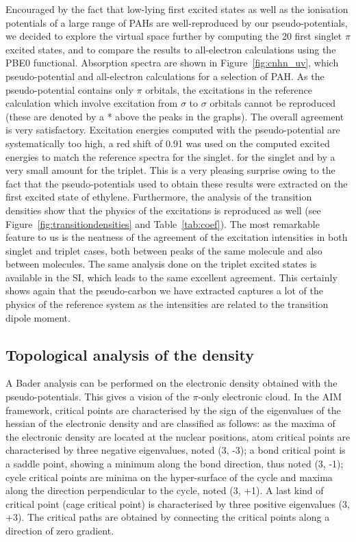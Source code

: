\documentclass[12pt]{article}
\begin{document}
Encouraged by the fact that low-lying first excited states as well as the ionisation potentials of a large range of PAHs are 
well-reproduced by our pseudo-potentials,
we decided to explore the virtual space further by computing the 20 first singlet
$\pi$ excited states, and to compare the results to all-electron calculations using the PBE0 functional.
Absorption spectra are shown in Figure~\ref{fig:cnhn_uv}, which pseudo-potential and all-electron
calculations for a selection of PAH.
As the pseudo-potential contains only $\pi$ orbitals, the excitations in the reference
calculation which involve excitation from $\sigma$ to $\sigma$ orbitals cannot be reproduced 
(these are denoted by a * above the peaks in the graphs).
The overall agreement is very satisfactory.
Excitation energies computed with the pseudo-potential are systematically too high, a red shift of
0.91 was used on the computed excited energies to match the reference spectra for the singlet.
for the singlet and by a very small amount for the triplet.
This is a very pleasing surprise owing to the fact that the pseudo-potentials used
to obtain these results were extracted on the first excited state of ethylene.
Furthermore, the analysis of the transition densities show that the physics of the excitations
is reproduced as well (see Figure~\ref{fig:transitiondensities} and Table~\ref{tab:coef}).
The most remarkable feature to us is the neatness of the agreement of the excitation intensities in both singlet and triplet cases, both between peaks of the same molecule and also between molecules.
The same analysis done on the triplet excited states is available in the SI, which leads to the same
excellent agreement.
This certainly shows again that the pseudo-carbon we have extracted captures a lot of the physics of the reference system as the intensities are related to the transition dipole moment.

\subsection*{\sffamily \large Topological analysis of the density}
A Bader analysis can be performed on the electronic density obtained with the pseudo-potentials.\cite{bader}
This gives a vision of the $\pi$-only electronic cloud.
In the AIM framework, critical points are characterised by the sign of the eigenvalues of the hessian of 
the electronic density and are classified as follows:
as the maxima of the electronic density are located at the nuclear positions,
atom critical points are characterised by three negative eigenvalues, noted (3, -3);
a bond critical point is a saddle point, showing a minimum along the bond direction,
thus noted (3, -1); cycle critical points are minima on the hyper-surface of the cycle
and maxima along the direction perpendicular to the cycle, noted (3, +1).
A last kind of critical point (cage critical point) is characterised by three positive eigenvalues
(3, +3).
The critical paths are obtained by connecting the critical points along a direction of zero gradient.
\end{document}
